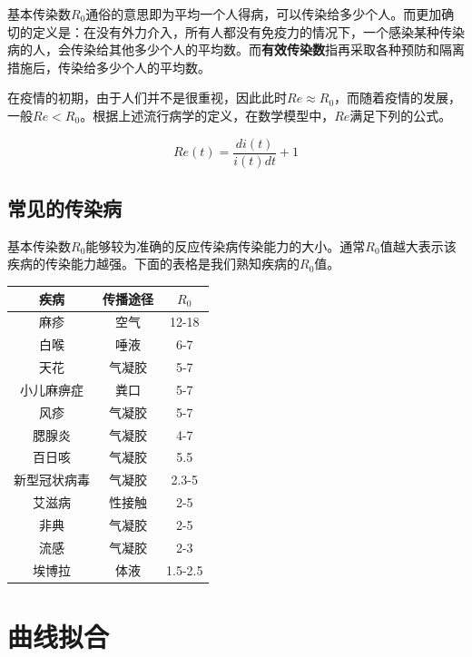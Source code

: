\documentclass{article}
\begin{document}
\begin{multicols}{2}
                基本传染数$R_{0}$通俗的意思即为平均一个人得病，可以传染给多少个人。而更加确切的定义是：在没有外力介入，所有人都没有免疫力的情况下，一个感染某种传染病的人，会传染给其他多少个人的平均数。而\textbf{有效传染数}指再采取各种预防和隔离措施后，传染给多少个人的平均数。

                在疫情的初期，由于人们并不是很重视，因此此时$Re{\approx}R_{0}$，而随着疫情的发展，一般$Re<R_{0}$。根据上述流行病学的定义，在数学模型中，$Re$满足下列的公式。

                \begin{equation}
                    Re(t)={\frac{di(t)}{i(t)dt}}+1
                    \label{z1}
                \end{equation}

            \subsection{常见的传染病}
                基本传染数$R_{0}$能够较为准确的反应传染病传染能力的大小。通常$R_{0}$值越大表示该疾病的传染能力越强。下面的表格是我们熟知疾病的$R_{0}$值\cite{r0}。

                \begin{tabular}{ccc}
                    \hline
                    疾病 & 传播途径 & $R_{0}$ \\
                    \hline
                    麻疹 & 空气 & 12-18 \\
                    白喉 & 唾液 & 6-7 \\
                    天花 & 气凝胶 & 5-7 \\
                    小儿麻痹症 & 粪口 & 5-7 \\
                    风疹 & 气凝胶 & 5-7 \\
                    腮腺炎 & 气凝胶 & 4-7 \\
                    百日咳 & 气凝胶 & 5.5 \\
                    新型冠状病毒 & 气凝胶 & 2.3-5 \\
                    艾滋病 & 性接触 & 2-5 \\
                    非典 & 气凝胶 & 2-5 \\
                    流感 & 气凝胶 & 2-3 \\
                    埃博拉 & 体液 & 1.5-2.5 \\
                    \hline
                \end{tabular}
        \section{曲线拟合}

\end{multicols}
\end{document}
